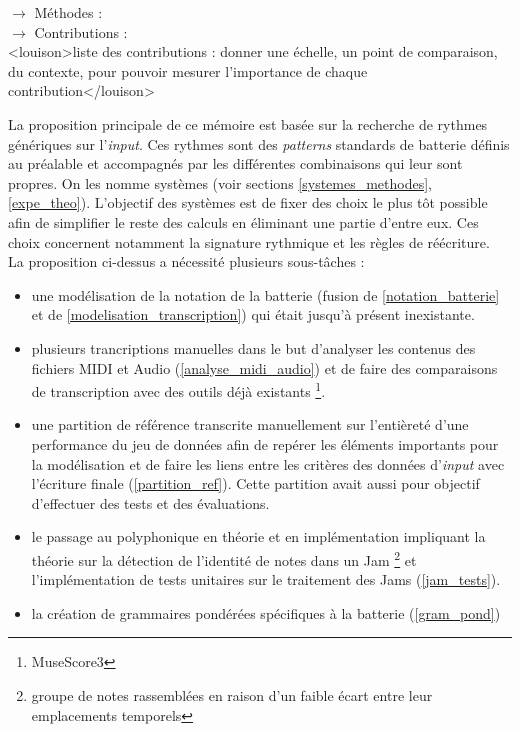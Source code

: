 $\to$ Méthodes :\\
$\to$ Contributions :\\
<louison>liste des contributions : donner une échelle, un point de comparaison, du
contexte, pour pouvoir mesurer l'importance de chaque contribution</louison>

La proposition principale de ce mémoire est basée sur la recherche de rythmes
génériques sur l’\textit{input}. Ces rythmes sont des \textit{patterns}
standards de batterie définis au préalable et accompagnés par les différentes
combinaisons qui leur sont propres. On les nomme systèmes (voir sections
\ref{systemes_methodes}, \ref{expe_theo}). L’objectif des systèmes est de fixer
des choix le plus tôt possible afin de simplifier le reste des calculs en
éliminant une partie d’entre eux. Ces choix concernent notamment la signature rythmique
et les règles de réécriture.\\

La proposition ci-dessus a nécessité plusieurs sous-tâches :
\begin{itemize}
    \item une modélisation de la notation de la batterie
        (fusion de \ref{notation_batterie} et de
        \ref{modelisation_transcription}) qui était jusqu’à présent
        inexistante.
    \item plusieurs trancriptions manuelles dans le but d’analyser les contenus
        des fichiers MIDI et Audio (\ref{analyse_midi_audio}) et de faire des
        comparaisons de transcription avec des outils déjà existants
        \footnote{MuseScore3}.
    \item une partition de référence transcrite manuellement sur l’entièreté
        d’une performance du jeu de données afin de repérer les éléments
        importants pour la modélisation et de faire les liens entre les
        critères des données d’\textit{input} avec l’écriture finale
        (\ref{partition_ref}). Cette partition avait aussi pour objectif
        d’effectuer des tests et des évaluations.
    \item le passage au polyphonique en théorie et en implémentation impliquant
        la théorie sur la détection de l’identité de notes dans un Jam
        \footnote{groupe de notes rassemblées en raison d’un faible écart entre
            leur emplacements temporels} et l’implémentation de tests unitaires
            sur le traitement des Jams (\ref{jam_tests}).
    \item  la création de grammaires pondérées spécifiques à
        la batterie (\ref{gram_pond})\\
\end{itemize}

